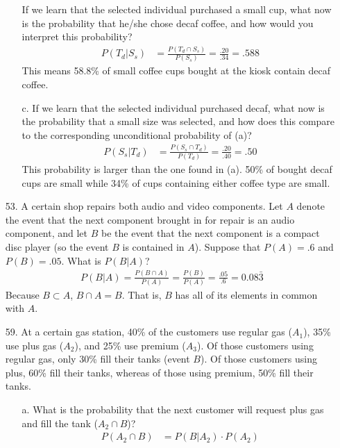 \documentclass[letterpaper,12pt]{article}
\begin{document}
\begin{enumerate}
\begin{enumerate}
        If we learn that the selected individual purchased a small cup, what now is the probability that he/she chose decaf coffee, and how would you interpret this probability?
        \begin{align*}
          P(T_d|S_s) &= \frac{P(T_d \cap S_s)}{P(S_s)} = \frac{.20}{.34} = .588
        \end{align*}
        This means 58.8\% of small coffee cups bought at the kiosk contain decaf coffee.
      \item[c.]
        If we learn that the selected individual purchased decaf, what now is the probability that a small size was selected, and how does this compare to the corresponding unconditional probability of (a)?
        \begin{align*}
          P(S_s|T_d) &= \frac{P(S_s \cap T_d)}{P(T_d)} = \frac{.20}{.40} = .50
        \end{align*}
        This probability is larger than the one found in (a). 50\% of bought decaf cups are small while 34\% of cups containing either coffee type are small.
    \end{enumerate}
  \item[53.]
    A certain shop repairs both audio and video components. Let $A$ denote the event that the next component brought in for repair is an audio component, and let $B$ be the event that the next component is a compact disc player (so the event $B$ is contained in $A$). Suppose that $P(A) = .6$ and $P(B) = .05$. What is $P(B|A)$?
    \begin{align*}
      P(B|A) = \frac{P(B \cap A)}{P(A)} = \frac{P(B)}{P(A)} = \frac{.05}{.6} = 0.08\bar{3}
    \end{align*}
    Because $B \subset A$, $B \cap A = B$. That is, $B$ has all of its elements in common with $A$.
  \item[59.]
    At a certain gas station, 40\% of the customers use regular gas ($A_1$), 35\% use plus gas ($A_2$), and 25\% use premium ($A_3$). Of those customers using regular gas, only 30\% fill their tanks (event $B$). Of those customers using plus, 60\% fill their tanks, whereas of those using premium, 50\% fill their tanks.
    \begin{enumerate}
      \item[a.]
        What is the probability that the next customer will request plus gas and fill the tank ($A_2 \cap B$)?
        \begin{align*}
          P(A_2 \cap B) &= P(B|A_2) \cdot P(A_2) \\

\end{align*}
\end{enumerate}
\end{enumerate}
\end{document}
